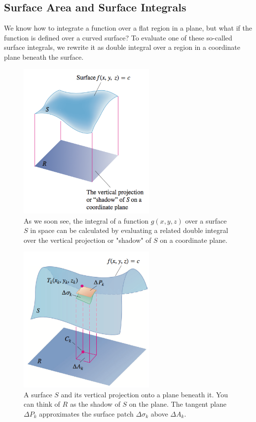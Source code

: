 \documentclass[a4paper,12pt]{article}
\begin{document}
\begin{CJK}{UTF8}{gbsn}
\section{Surface Area and Surface Integrals}
We know how to integrate a function over a flat region in a plane, 
but what if the function is defined over a curved surface? To evaluate 
one of these so-called surface integrals, we rewrite it as double 
integral over a region in a coordinate plane beneath the surface.
\begin{figure}[htbp]
    \centering
    \includegraphics[width=0.6\textwidth]{surface0.png}
    \caption{As we soon see, the integral of a function $g(x,y,z)$ 
    over a surface $S$ in space can be calculated by evaluating 
    a related double integral over the vertical projection or "shadow"
    of $S$ on a coordinate plane.}
    \label{fig:fig2}
\end{figure}
\begin{figure}[htbp]
    \centering
    \includegraphics[width=0.6\textwidth]{surface1.png}
    \caption{A surface $S$ and its vertical projection onto a plane beneath 
    it. You can think of $R$ as the shadow of $S$ on the plane. The tangent 
    plane $\Delta P_k$  approximates the surface patch $\Delta \sigma_k$  above $\Delta A_k.$}
    \label{fig:fig3}
\end{figure}


\end{CJK}
\end{document}
